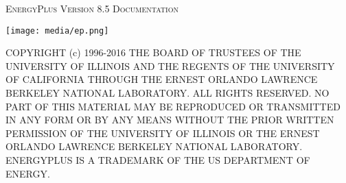 \makeatletter
\begin{titlepage}
  \begin{center}
    {\scshape\LARGE EnergyPlus\texttrademark{} Version 8.5 Documentation \par}
    \vspace{1.5cm}
    {\bfseries\huge \@title \par}
    \vspace{1.5cm}
    {\Large\itshape \@author \par}
    \vspace{2.5cm}
    \texttt{[image: media/ep.png]}\par\vspace{1cm}
    \vfill

    {\large \@date \par}
    \vspace{1.5cm}
  \end{center}
  {\small
COPYRIGHT (c) 1996-2016 THE BOARD OF TRUSTEES OF THE UNIVERSITY OF ILLINOIS AND THE REGENTS OF THE UNIVERSITY OF CALIFORNIA THROUGH THE ERNEST ORLANDO LAWRENCE BERKELEY NATIONAL LABORATORY. ALL RIGHTS RESERVED. NO PART OF THIS MATERIAL MAY BE REPRODUCED OR TRANSMITTED IN ANY FORM OR BY ANY MEANS WITHOUT THE PRIOR WRITTEN PERMISSION OF THE UNIVERSITY OF ILLINOIS OR THE ERNEST ORLANDO LAWRENCE BERKELEY NATIONAL LABORATORY. ENERGYPLUS IS A TRADEMARK OF THE US DEPARTMENT OF ENERGY.
  }
\end{titlepage}
\makeatother

{
\setcounter{tocdepth}{2}
\tableofcontents
}

\hypertarget{generated-toc}{}
